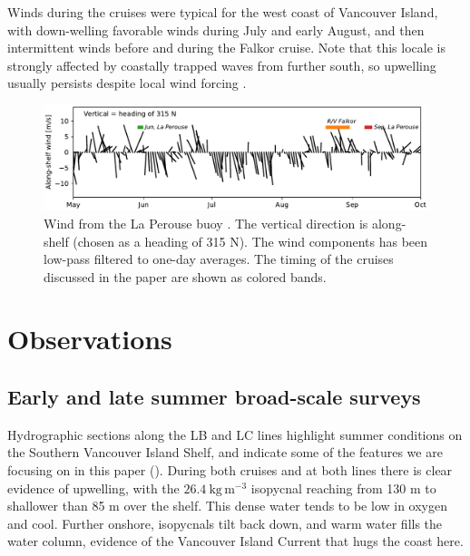 \documentclass[draft]{agujournal2019}
\begin{document}
Winds during the cruises were typical for the west coast of Vancouver Island, with down-welling favorable winds during July and early August, and then intermittent winds before and during the Falkor cruise.  Note that this locale is strongly affected by coastally trapped waves from further south, so upwelling usually persists despite local wind forcing \cite{thomsonkrassovski15, engidaetal16}.

\begin{figure}[htbp]
  \begin{center}
    \includegraphics[width=5.5in]{LaPeWind}
    \caption{
      Wind from the La Perouse buoy \cite{DFOWind2013C46206}.  The vertical direction is along-shelf (chosen as a heading of 315 N).  The wind components has been low-pass filtered to one-day averages.  The timing of the cruises discussed in the paper are shown as colored bands.
      \label{fig:LaPeWind} }
  \end{center}
\end{figure}


\section{Observations}
\label{sec:Observations}

\subsection{Early and late summer broad-scale surveys}

Hydrographic sections along the LB and LC lines highlight summer conditions on the Southern Vancouver Island Shelf, and indicate some of the features we are focusing on in this paper ().  During both cruises and at both lines there is clear evidence of upwelling, with the $26.4\ \mathrm{kg\,m^{-3}}$ isopycnal reaching from 130 m to shallower than 85 m over the shelf.  This dense water tends to be low in oxygen and cool. Further onshore, isopycnals tilt back down, and warm water fills the water column, evidence of the Vancouver Island Current that hugs the coast here.
\end{document}
